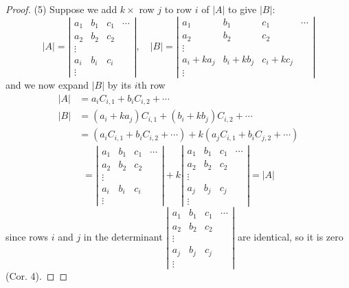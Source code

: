 \documentclass[
  letterpaper,
  DIV=11,
  numbers=noendperiod]{scrartcl}
\theoremstyle{remark}
\begin{document}
\begin{proof}
(5) Suppose we add \(k\times\) row \(j\) to row \(i\) of \(\left|
A\right|\) to give \(\left| B\right| :\) \[\left| A\right| =\left| 
\begin{array}{cccc}
a_{1} & b_{1} & c_{1} & \cdots \\ 
a_{2} & b_{2} & c_{2} &  \\ 
\vdots &  &  &  \\ 
a_{i} & b_{i} & c_{i} &  \\ 
\vdots &  &  & 
\end{array}
\right| ,\quad \left| B\right| =\left| 
\begin{array}{cccc}
a_{1} & b_{1} & c_{1} & \cdots \\ 
a_{2} & b_{2} & c_{2} &  \\ 
\vdots &  &  &  \\ 
a_{i}+ka_{j} & b_{i}+kb_{j} & c_{i}+kc_{j} &  \\ 
\vdots &  &  & 
\end{array}
\right|\] and we now expand \(\left| B\right|\) by its \(i\)th row
\[\begin{aligned}
\left| A\right| &=a_{i}C_{i,1}+b_{i}C_{i,2}+\cdots \\
\left| B\right| &=\left( a_{i}+ka_{j}\right) C_{i,1}+\left(
b_{i}+kb_{j}\right) C_{i,2}+\cdots \\
&=\left( a_{i}C_{i,1}+b_{i}C_{i,2}+\cdots \right) +k\left(
a_{j}C_{i,1}+b_{i}C_{j,2}+\cdots \right)
\end{aligned}\] \[=\left| 
\begin{array}{cccc}
a_{1} & b_{1} & c_{1} & \cdots \\ 
a_{2} & b_{2} & c_{2} &  \\ 
\vdots &  &  &  \\ 
a_{i} & b_{i} & c_{i} &  \\ 
\vdots &  &  & 
\end{array}
\right| +k\left| 
\begin{array}{cccc}
a_{1} & b_{1} & c_{1} & \cdots \\ 
a_{2} & b_{2} & c_{2} &  \\ 
\vdots &  &  &  \\ 
a_{j} & b_{j} & c_{j} &  \\ 
\vdots &  &  & 
\end{array}
\right| =\left| A\right|\] since rows \(i\) and \(j\) in the determinant
\(\left|
\begin{array}{cccc}
a_{1} & b_{1} & c_{1} & \cdots \\
a_{2} & b_{2} & c_{2} &  \\
\vdots &  &  &  \\
a_{j} & b_{j} & c_{j} &  \\
\vdots &  &  &
\end{array}
\right|\) are identical, so it is zero (Cor. 4).~◻
\end{proof}
\end{document}
